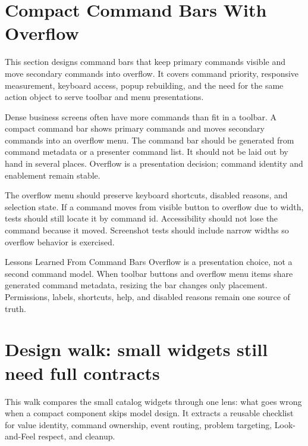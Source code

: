 \section{Compact Command Bars With Overflow}

\begin{roadmapbox}
This section designs command bars that keep primary commands visible and move
secondary commands into overflow. It covers command priority, responsive
measurement, keyboard access, popup rebuilding, and the need for the same action
object to serve toolbar and menu presentations.
\end{roadmapbox}

Dense business screens often have more commands than fit in a toolbar. A compact command
bar shows primary commands and moves secondary commands into an overflow menu. The
command bar should be generated from command metadata or a presenter command list. It
should not be laid out by hand in several places. Overflow is a presentation decision;
command identity and enablement remain stable.

The overflow menu should preserve keyboard shortcuts, disabled reasons, and selection
state. If a command moves from visible button to overflow due to width, tests should
still locate it by command id. Accessibility should not lose the command because it
moved. Screenshot tests should include narrow widths so overflow behavior is exercised.

\begin{principlebox}{Lessons Learned From Command Bars}
Overflow is a presentation choice, not a second command model. When toolbar
buttons and overflow menu items share generated command metadata, resizing the
bar changes only placement. Permissions, labels, shortcuts, help, and disabled
reasons remain one source of truth.
\end{principlebox}

\section{Design walk: small widgets still need full contracts}

\begin{roadmapbox}
This walk compares the small catalog widgets through one lens: what goes wrong
when a compact component skips model design. It extracts a reusable checklist
for value identity, command ownership, event routing, problem targeting,
Look-and-Feel respect, and cleanup.
\end{roadmapbox}

